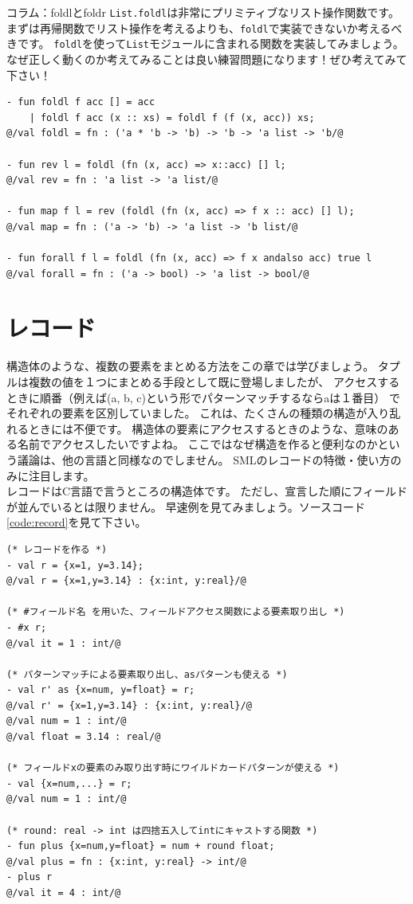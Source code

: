 \documentclass[11pt,a4paper]{article}
\begin{document}
\begin{itembox}[l]{コラム：foldlとfoldr}
  \lstinline{List.foldl}は非常にプリミティブなリスト操作関数です。
  まずは再帰関数でリスト操作を考えるよりも、\lstinline{foldl}で実装できないか考えるべきです。
  \lstinline{foldl}を使って\lstinline{List}モジュールに含まれる関数を実装してみましょう。
  なぜ正しく動くのか考えてみることは良い練習問題になります！ぜひ考えてみて下さい！
\begin{lstlisting}
- fun foldl f acc [] = acc
    | foldl f acc (x :: xs) = foldl f (f (x, acc)) xs;
@/val foldl = fn : ('a * 'b -> 'b) -> 'b -> 'a list -> 'b/@

- fun rev l = foldl (fn (x, acc) => x::acc) [] l;
@/val rev = fn : 'a list -> 'a list/@

- fun map f l = rev (foldl (fn (x, acc) => f x :: acc) [] l);
@/val map = fn : ('a -> 'b) -> 'a list -> 'b list/@

- fun forall f l = foldl (fn (x, acc) => f x andalso acc) true l
@/val forall = fn : ('a -> bool) -> 'a list -> bool/@
\end{lstlisting}
\end{itembox}

\section{レコード}
\label{sec:record}
構造体のような、複数の要素をまとめる方法をこの章では学びましょう。
タプルは複数の値を１つにまとめる手段として既に登場しましたが、
アクセスするときに順番（例えば(a, b, c)という形でパターンマッチするならaは１番目）
でそれぞれの要素を区別していました。
これは、たくさんの種類の構造が入り乱れるときには不便です。
構造体の要素にアクセスするときのような、意味のある名前でアクセスしたいですよね。
ここではなぜ構造を作ると便利なのかという議論は、他の言語と同様なのでしません。
SMLのレコードの特徴・使い方のみに注目します。\\
レコードはC言語で言うところの構造体です。
ただし、宣言した順にフィールドが並んでいるとは限りません。
早速例を見てみましょう。ソースコード\ref{code:record}を見て下さい。

\begin{lstlisting}[caption=レコードの例,label=code:record]
(* レコードを作る *)
- val r = {x=1, y=3.14};
@/val r = {x=1,y=3.14} : {x:int, y:real}/@

(* #フィールド名 を用いた、フィールドアクセス関数による要素取り出し *)
- #x r;
@/val it = 1 : int/@

(* パターンマッチによる要素取り出し、asパターンも使える *)
- val r' as {x=num, y=float} = r;
@/val r' = {x=1,y=3.14} : {x:int, y:real}/@
@/val num = 1 : int/@
@/val float = 3.14 : real/@

(* フィールドxの要素のみ取り出す時にワイルドカードパターンが使える *)
- val {x=num,...} = r;
@/val num = 1 : int/@

(* round: real -> int は四捨五入してintにキャストする関数 *)
- fun plus {x=num,y=float} = num + round float;
@/val plus = fn : {x:int, y:real} -> int/@
- plus r
@/val it = 4 : int/@
\end{lstlisting}
\end{document}
